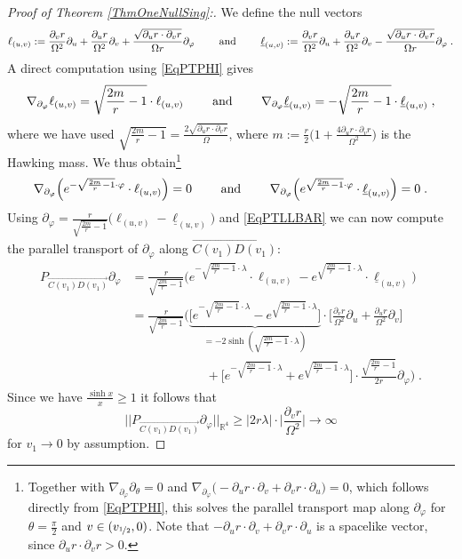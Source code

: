 \documentclass[reqno]{article}
\newcommand{\R}{\mathbb{R}}
\newcommand{\rd}{\partial}
\begin{document}
\begin{proof}[Proof of Theorem \ref{ThmOneNullSing}:]
 We define the null vectors
$$\ell_{(u,v)} := \frac{\rd_v r}{\Omega^2} \rd_u + \frac{\rd_u r}{\Omega^2} \rd_v + \frac{\sqrt{\rd_u r \cdot \rd_v r}}{\Omega r} \rd_\varphi \qquad \textnormal{ and } \qquad \underline{\ell}_{(u,v)} := \frac{\partial_v r}{ \Omega^2} \rd_u + \frac{\rd_ur}{\Omega^2} \rd_v - \frac{\sqrt{\rd_u r \cdot \rd_v r}}{\Omega r} \rd_\varphi \;. $$
A direct computation using \eqref{EqPTPHI} gives $$\nabla_{\rd_\varphi} \ell_{(u,v)} = \sqrt{\frac{2m}{r} - 1} \cdot \ell_{(u,v)} \qquad \textnormal{ and } \qquad \nabla_{\rd_\varphi}  \underline{\ell}_{(u,v)} = - \sqrt{\frac{2m}{r} - 1}  \cdot \underline{\ell}_{(u,v)} \;, $$
where we have used $\sqrt{\frac{2m}{r} - 1} = \frac{2\sqrt{\rd_u r \cdot \rd_v r}}{\Omega}$, where $m := \frac{r}{2}\big( 1 + \frac{4 \rd_u r \cdot \rd_v r}{\Omega^2}\big)$ is the Hawking mass. We thus obtain\footnote{Together with $\nabla_{\rd_\varphi} \rd_\theta = 0$ and $\nabla_{\rd_\varphi} \big( - \partial_u r \cdot \partial_v + \partial_v r \cdot \partial_u\big) = 0$, which follows directly from \eqref{EqPTPHI}, this solves the parallel transport map along $\rd_\varphi$ for $\theta = \frac{\pi}{2}$ and $v \in (v_{\nicefrac{1}{2}}, 0)$.   Note that $-\rd_u r \cdot \rd_v + \rd_v r \cdot \rd_u$ is a spacelike vector, since $\rd_u r \cdot \rd_v r > 0$. }
\begin{equation}
\label{EqPTLLBAR}
\nabla_{\rd_\varphi}\Big(e^{-\sqrt{\frac{2m}{r} - 1} \cdot \varphi }\cdot \ell_{(u,v)} \Big)= 0 \qquad \textnormal{ and } \qquad \nabla_{\rd_\varphi}\Big(e^{\sqrt{\frac{2m}{r} - 1} \cdot \varphi }\cdot \underline{\ell}_{(u,v)}\Big) = 0 \;.
\end{equation}
Using $\rd_\varphi = \frac{r}{\sqrt{\frac{2m}{r} - 1}} \big(\ell_{(u,v)} - \underline{\ell}_{(u,v)}\big)$ and \eqref{EqPTLLBAR} we can now compute the parallel transport of $\rd_\varphi$ along $\overrightarrow{C(v_1)D(v_1)}$:
\begin{equation*}
\begin{split}
P_{\overrightarrow{C(v_1)D(v_1)}} \partial_\varphi &= \frac{r}{\sqrt{\frac{2m}{r} - 1}} \Big( e^{-\sqrt{\frac{2m}{r} - 1} \cdot \lambda} \cdot \ell_{(u,v)} - e^{\sqrt{\frac{2m}{r} - 1} \cdot \lambda} \cdot \underline{\ell}_{(u,v)}\Big) \\
&= \frac{r}{\sqrt{\frac{2m}{r} - 1}} \Big( \underbrace{\big[ e^{-\sqrt{\frac{2m}{r} - 1} \cdot \lambda} - e^{\sqrt{\frac{2m}{r} - 1} \cdot \lambda}\big]}_{= - 2 \sinh (\sqrt{\frac{2m}{r}-1} \cdot \lambda)} \cdot \big[ \frac{\rd_v r}{\Omega^2} \rd_u + \frac{\rd_u r}{\Omega^2} \rd_v\big] \\
&\qquad \qquad \qquad + \big[ e^{-\sqrt{\frac{2m}{r} - 1} \cdot \lambda} + e^{\sqrt{\frac{2m}{r} - 1} \cdot \lambda}\big] \cdot \frac{\sqrt{\frac{2m}{r} - 1}}{2r} \rd_\varphi\Big) \;.
\end{split}
\end{equation*}
Since we have $\frac{\sinh x}{x} \geq 1$ it follows that
\begin{equation}
\label{EqPPHIINFINITE}
||P_{\overrightarrow{C(v_1)D(v_1)}} \partial_\varphi||_{\R^4} \geq |2 r \lambda| \cdot \Big|\frac{ \rd_v r}{\Omega^2}\Big| \to \infty
\end{equation}
for $v_1 \to 0$ by assumption. 


\end{proof}
\end{document}
